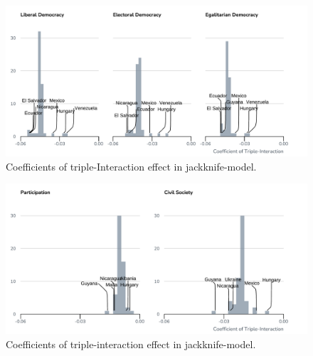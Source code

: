 \documentclass[
  abstract]{article}
\begin{document}
\elandscape

\blandscape

\begin{figure}[H]

{\centering \includegraphics{results/graphs/jackknife_plots.pdf}

}

\caption{\label{fig-jackknife1}Coefficients of triple-Interaction effect
in jackknife-model.}

\end{figure}

\begin{figure}[H]

{\centering \includegraphics{results/graphs/jackknife_plots2.pdf}

}

\caption{\label{fig-jackknife2}Coefficients of triple-interaction effect
in jackknife-model.}

\end{figure}

\elandscape
\end{document}
